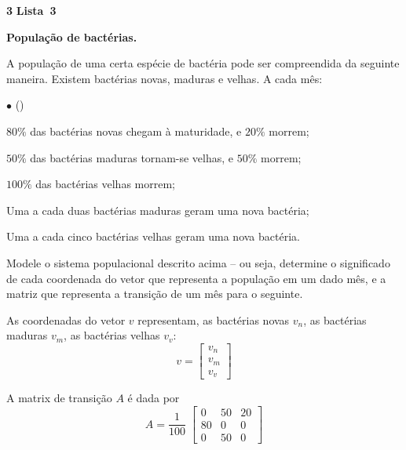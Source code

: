 \documentclass{article}
\newenvironment{question}
    {\medskip\bfseries\large}
    {\medskip}
\newcounter{exe-list}
\newenvironment{exe-list}
    {\begin{list}{(\alph{exe-list})}{\usecounter{exe-list}}}
    {\end{list}}
\newenvironment{exe}[2][Sala]
    {\bigskip\noindent\par\ifthenelse{\equal{#1}{}}%
        {\textbf{\LARGE #2}}%
        {\textbf{\LARGE #1~#2}}%
    \medskip\noindent\par}
    {\bigskip}
\begin{document}
\begin{exe}[Lista]{3}
    \begin{question}
        População de bactérias. \medskip\noindent\par
        A população de uma certa espécie de bactéria
        pode ser compreendida da seguinte maneira.
        Existem bactérias novas, maduras e velhas.
        A cada mês:
        \begin{list}{\(\bullet\) ()}{}
            \addtocounter{exe-list}{-1}
            \item
                \(80\%\) das bactérias novas
                chegam à maturidade, e
                \(20\%\) morrem;
            \item
                \(50\%\) das bactérias maduras
                tornam-se velhas, e
                \(50\%\) morrem;
            \item
                \(100\%\) das bactérias velhas morrem;
            \item
                Uma a cada duas bactérias maduras
                geram uma nova bactéria;
            \item
                Uma a cada cinco bactérias velhas
                geram uma nova bactéria.
        \end{list}

        \begin{exe-list}
            \item
                Modele o sistema populacional descrito acima --
                ou seja, determine o significado de
                cada coordenada do vetor que representa a população
                em um dado mês,
                e a matriz que representa
                a transição de um mês para o seguinte.
        \end{exe-list}
    \end{question}

    As coordenadas do vetor \(v\) representam,
    as bactérias novas \(v_n\),
    as bactérias maduras \(v_m\),
    as bactérias velhas \(v_v\):
    \[
        v = \begin{bmatrix}
            v_n \\ v_m \\ v_v
        \end{bmatrix}
    \]

    A matrix de transição \(A\) é dada por
    \[
        A = \frac{1}{100} \; \begin{bmatrix}
            0 & 50 & 20 \\
            80 & 0 & 0 \\
            0 & 50 & 0
        \end{bmatrix}
    \]
\end{exe}
\end{document}

